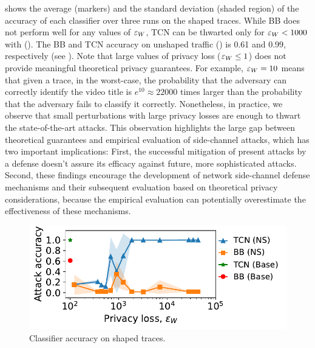  shows the average (markers) and the standard deviation (shaded region) of the accuracy of each classifier over three runs on the shaped traces.
While BB does not perform well for any values of $\varepsilon_{W}$, TCN can be thwarted only for $\varepsilon_{W} < 1000$ with {\sys} (\ns).
The BB and TCN accuracy on unshaped traffic ({\base}) is 0.61 and 0.99, respectively (see ).
Note that large values of privacy loss (\ie $\varepsilon_{W} \leq 1$) does not provide meaningful theoretical privacy guarantees.
For example, $\varepsilon_{W}=10$ means that given a trace, in the worst-case, the probability that the adversary can correctly identify the video title is $e^{10} \approx 22000$ times larger than the probability that the adversary fails to classify it correctly.
Nonetheless, in practice, we observe that small perturbations with large privacy losses are enough to thwart the state-of-the-art attacks.
This observation highlights the large gap between theoretical guarantees and empirical evaluation of side-channel attacks, which has two important implications: First, the successful mitigation of present attacks by a defense doesn't assure its efficacy against future, more sophisticated attacks.
Second, these findings encourage the development of network side-channel defense mechanisms and their subsequent evaluation based on theoretical privacy considerations, because the empirical evaluation can potentially overestimate the effectiveness of these mechanisms.


\begin{figure}[t]
  \centering
  \includegraphics[width=\columnwidth]{plots/accuracy_vs_privacy_loss_video.pdf}
  \caption{Classifier accuracy on shaped traces.
  }
  \label{fig:empirical-privacy}
\end{figure}